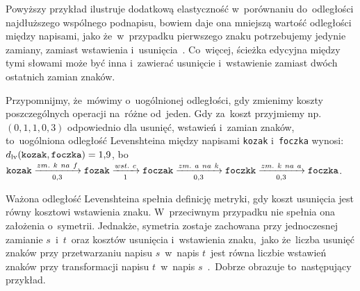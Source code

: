 \documentclass{praca1}
\begin{document}
Powyższy przykład ilustruje dodatkową elastyczność w~porównaniu do~odległości najdłuższego wspólnego podnapisu, bowiem daje ona mniejszą wartość odległości między napisami, jako że~w~przypadku pierwszego znaku potrzebujemy jedynie zamiany, zamiast wstawienia i~usunięcia~\cite{Loo2014:stringdist}. Co~więcej, ścieżka edycyjna między tymi słowami może być inna i~zawierać usunięcie i~wstawienie zamiast dwóch ostatnich zamian znaków.


Przypomnijmy, że~mówimy o~uogólnionej odległości, gdy zmienimy koszty poszczególnych operacji na~różne od~jeden.
Gdy za~koszt przyjmiemy np. $(0{,}1, 1, 0{,}3)$ odpowiednio dla usunięć, wstawień i~zamian znaków, to~uogólniona odległość Levenshteina między napisami \verb|kozak| i~\verb|foczka| wynosi: $d_{\mathrm{lv}}(\verb|kozak|, \verb|foczka|) = 1{,}9$, bo~$\verb|kozak|  \xrightarrow[0{,}3]{zm.\ k\ na\ f} \verb|fozak| \xrightarrow[1]{wst.\ c} \verb|foczak| \xrightarrow[0{,}3]{zm.\ a\ na\ k} \verb|foczkk| \xrightarrow[0{,}3]{zm.\ k\ na\ a} \verb|foczka|$.

Ważona odległość Levenshteina spełnia definicję metryki, gdy koszt usunięcia jest równy kosztowi wstawienia znaku. W~przeciwnym przypadku nie spełnia ona założenia o~symetrii. Jednakże, symetria zostaje zachowana przy jednoczesnej zamianie $s$~i~$t$~oraz kosztów usunięcia i~wstawienia znaku,~jako że~liczba usunięć znaków przy przetwarzaniu napisu $s$~w~napis $t$~jest równa liczbie wstawień znaków przy transformacji napisu $t$~w~napis $s$~\cite{Loo2014:stringdist}.~Dobrze obrazuje to~następujący przykład.
\end{document}
